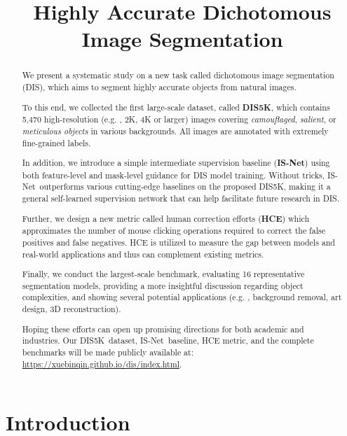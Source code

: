 \title{Highly Accurate Dichotomous Image Segmentation}

\begin{abstract}
We present a systematic study on a new task called dichotomous image segmentation (DIS), which aims to segment highly accurate objects from natural images. 

To this end, we collected the first large-scale dataset, called \textbf{DIS5K}, which contains 5,470 high-resolution (e.g. , 2K, 4K or larger) images covering \textit{camouflaged}, \textit{salient}, or \textit{meticulous objects} in various backgrounds. All images are annotated with extremely fine-grained labels. 

In addition, we introduce a simple intermediate supervision baseline (\textbf{IS-Net}) using both feature-level and mask-level guidance for DIS model training. Without tricks, IS-Net~outperforms various cutting-edge baselines on the proposed DIS5K, making it a general self-learned supervision network that can help facilitate future research in DIS.

Further, we design a new metric called human correction efforts (\textbf{HCE}) which approximates the number of mouse clicking operations required to correct the false positives and false negatives. HCE is utilized to measure the gap between models and real-world applications and thus can complement existing metrics.

Finally, we conduct the largest-scale benchmark, evaluating 16 representative segmentation models, providing a more insightful discussion regarding object complexities, and showing several potential applications (e.g. , background removal, art design, 3D reconstruction).

Hoping these efforts can open up promising directions for both academic and industries. Our DIS5K~dataset, IS-Net~baseline, HCE metric, and the complete benchmarks will be made publicly available at: \url{https://xuebinqin.github.io/dis/index.html}.
\end{abstract}

\section{Introduction}

